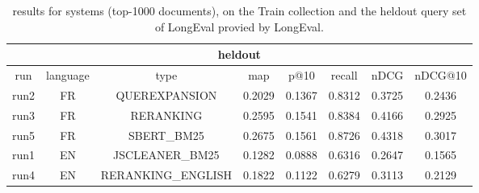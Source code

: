 
\begin{table}[h!]
    \centering
    \begin{tabular}{ |c|c|c|c|c|c|c|c| }
        \hline
        \hline
        \multicolumn{8}{|c|}{heldout} \\ \hline
        run  & language & type & map & p@10 & recall & nDCG & nDCG@10 \\ \hline
        run2 &   FR   & QUEREXPANSION & 0.2029 & 0.1367 & 0.8312 & 0.3725 & 0.2436 \\
        run3 &   FR   & RERANKING & 0.2595 & 0.1541 & 0.8384 & 0.4166 & 0.2925 \\
        run5 &   FR   & SBERT\_BM25 & 0.2675 & 0.1561 & 0.8726 & 0.4318 & 0.3017 \\
        \hline
        run1 &   EN   & JSCLEANER\_BM25 & 0.1282 & 0.0888 & 0.6316 & 0.2647 & 0.1565 \\
        run4 &   EN   & RERANKING\_ENGLISH & 0.1822 & 0.1122 & 0.6279 & 0.3113 & 0.2129 \\
        \hline
    \end{tabular}
    \caption{results for systems (top-1000 documents), on the Train collection and the heldout query set of LongEval provied by LongEval.}
    \label{tab:results_submission_heldout}
\end{table}


